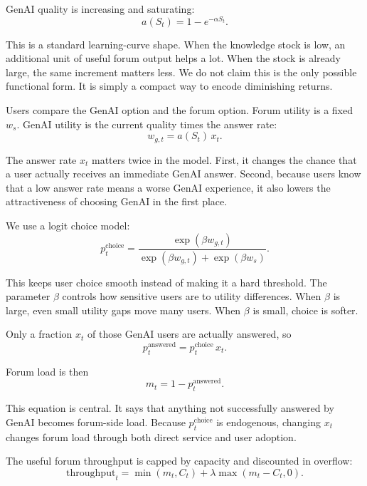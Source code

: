 \documentclass{article}
\begin{document}
GenAI quality is increasing and saturating:
\begin{equation}
a(S_t) = 1 - e^{-\alpha S_t}.
\end{equation}

This is a standard learning-curve shape. When the knowledge stock is low, an additional unit of useful forum output helps a lot. When the stock is already large, the same increment matters less. We do not claim this is the only possible functional form. It is simply a compact way to encode diminishing returns.

Users compare the GenAI option and the forum option. Forum utility is a fixed $w_s$. GenAI utility is the current quality times the answer rate:
\begin{equation}
w_{g,t} = a(S_t)\,x_t.
\end{equation}

The answer rate $x_t$ matters twice in the model. First, it changes the chance that a user actually receives an immediate GenAI answer. Second, because users know that a low answer rate means a worse GenAI experience, it also lowers the attractiveness of choosing GenAI in the first place.

We use a logit choice model:
\begin{equation}
p^{\text{choice}}_t = \frac{\exp(\beta w_{g,t})}{\exp(\beta w_{g,t}) + \exp(\beta w_s)}.
\end{equation}

This keeps user choice smooth instead of making it a hard threshold. The parameter $\beta$ controls how sensitive users are to utility differences. When $\beta$ is large, even small utility gaps move many users. When $\beta$ is small, choice is softer.

Only a fraction $x_t$ of those GenAI users are actually answered, so
\begin{equation}
p^{\text{answered}}_t = p^{\text{choice}}_t\,x_t.
\end{equation}

Forum load is then
\begin{equation}
m_t = 1 - p^{\text{answered}}_t.
\end{equation}

This equation is central. It says that anything not successfully answered by GenAI becomes forum-side load. Because $p_t^{\text{choice}}$ is endogenous, changing $x_t$ changes forum load through both direct service and user adoption.

The useful forum throughput is capped by capacity and discounted in overflow:
\begin{equation}
\text{throughput}_t = \min(m_t,C_t) + \lambda \max(m_t-C_t,0).
\end{equation}
\end{document}
